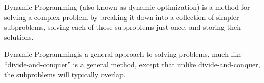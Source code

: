 
\begin{frame}

Dynamic Programming (also known as dynamic optimization) is a method for solving a complex problem by breaking it down into a collection of simpler subproblems, solving each of those subproblems just once, and storing their solutions.



Dynamic Programmingis a general approach to solving problems, much like “divide-and-conquer” is a general
method, except that unlike divide-and-conquer, the subproblems will typically overlap.

\end{frame}